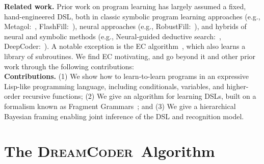 \documentclass{article}
\newcommand{\system}{\textsc{DreamCoder}~}
\begin{document}

\textbf{Related work.} Prior work on program learning has largely assumed a fixed, hand-engineered DSL,
both in classic symbolic program learning approaches (e.g., Metagol:~\cite{muggleton2015meta},
FlashFill:~\cite{gulwani2011automating}),
neural approaches  (e.g., RobustFill:~\cite{devlin2017robustfill}), and hybrids of neural and
symbolic methods (e.g., Neural-guided deductive search:~\cite{ngds}, DeepCoder:~\cite{balog2016deepcoder}).
A notable exception is the EC algorithm~\cite{Dechter:2013:BLV:2540128.2540316},
which also learns a library of subroutines.
We find EC motivating, and go beyond it and other prior work through the following contributions: %
\\\textbf{Contributions.} (1) We show how to learn-to-learn programs in an expressive Lisp-like programming language, including conditionals, variables, and higher-order recursive functions;
(2) We give an algorithm for learning DSLs,
built on a formalism known as Fragment Grammars~\cite{tim};
and (3) We give a hierarchical Bayesian framing enabling joint inference of the DSL and recognition model.


\section{The \system Algorithm}
\end{document}
